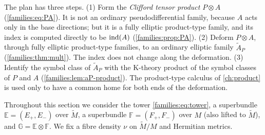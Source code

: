 \begin{discussion}
  The plan has three steps. (1) Form the \emph{Clifford tensor product}
  $P\otimes A$ (\eqref{families:eq:PA}). It is not an ordinary pseudodifferential
  family, because $A$ acts only in the base directions; but it is a fully elliptic
  product-type family, and its index is computed directly to be $\operatorname{ind}(A)$
  (\cref{families:prop:PA}). (2) Deform $P\otimes A$, through fully elliptic
  product-type families, to an ordinary elliptic family $\tilde A_P$
  (\cref{families:thm:mult}). The index does not change along the deformation.
  (3) Identify the symbol class of $\tilde A_P$ with the K-theory product of the
  symbol classes of $P$ and $A$ (\cref{families:lem:aP-product}). The
  product-type calculus of \cref{ch:product} is used only to have a common home
  for both ends of the deformation.
\end{discussion}

Throughout this section we consider the tower \eqref{families:eq:tower}, a
superbundle $\mathbb E=(E_+,E_-)$ over $\tilde M$, a superbundle
$\mathbb F=(F_+,F_-)$ over $M$ (also lifted to $\tilde M$), and
$\mathbb G=\mathbb E\otimes\mathbb F$. We fix a fibre density $\nu$ on
$\tilde M/M$ and Hermitian metrics.

